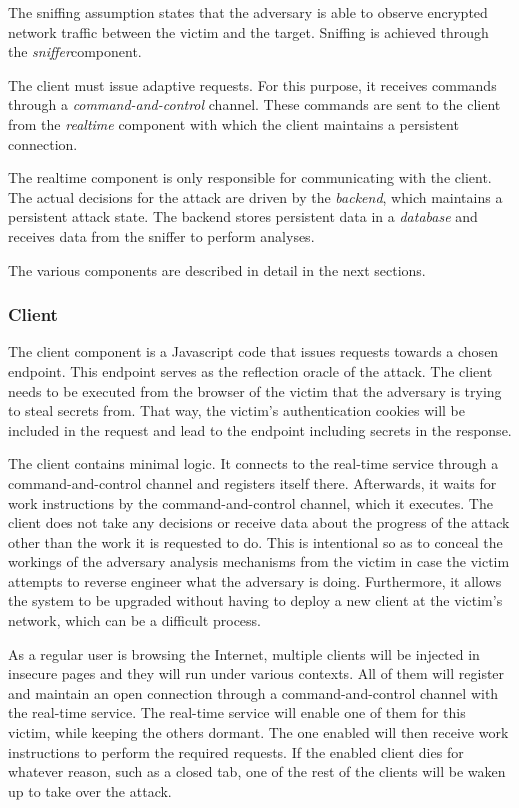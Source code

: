 \documentclass[conference, letterpaper, 10pt]{IEEEtran}
\begin{document}
The sniffing assumption states that the adversary is able to observe encrypted network
traffic between the victim and the target.
Sniffing is achieved through the \textit{sniffer}component.

The client must issue adaptive requests. For this purpose, it receives commands
through a \textit{command-and-control} channel. These commands are sent to the
client from the \textit{realtime} component with which the client maintains a
persistent connection.

The realtime component is only responsible for communicating with the client.
The actual decisions for the attack are driven by the \textit{backend}, which
maintains a persistent attack state. The backend stores persistent data in a
\textit{database} and receives data from the sniffer to perform analyses.

The various components are described in detail in the next sections.

\subsubsection{Client}

The client component is a Javascript code that issues requests towards a chosen
endpoint. This endpoint serves as the reflection oracle of the attack. The client
needs to be executed from the browser of the victim that the adversary is trying
to steal secrets from. That way, the victim's authentication cookies will be
included in the request and lead to the endpoint including secrets in the
response.

The client contains minimal logic. It connects to the real-time service through
a command-and-control channel and registers itself there. Afterwards, it waits
for work instructions by the command-and-control channel, which it executes. The
client does not take any decisions or receive data about the progress of the
attack other than the work it is requested to do. This is intentional so as
to conceal the workings of the adversary analysis mechanisms from the victim
in case the victim attempts to reverse engineer what the adversary is doing.
Furthermore, it allows the system to be upgraded without having to deploy a
new client at the victim's network, which can be a difficult process.

As a regular user is browsing the Internet, multiple clients will be
injected in insecure pages and they will run under various contexts. All of
them will register and maintain an open connection through a
command-and-control channel with the real-time service. The real-time
service will enable one of them for this victim, while keeping the others
dormant. The one enabled will then receive work instructions to perform the
required requests. If the enabled client dies for whatever reason, such as a
closed tab, one of the rest of the clients will be waken up to take over the
attack.
\end{document}

